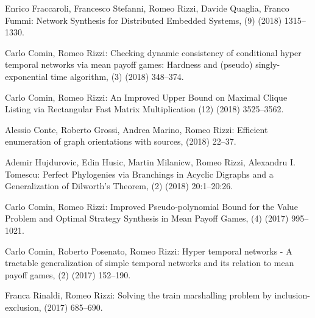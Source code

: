 \begin{etaremune}
  \vspace{-3.0mm}
  
  \item {\sc Enrico Fraccaroli, Francesco Stefanni, Romeo Rizzi, Davide Quaglia, Franco Fummi:}
   \newblock Network Synthesis for Distributed Embedded Systems,
   (9) (2018) 1315--1330.

  \item {\sc Carlo Comin, Romeo Rizzi:}
   \newblock Checking dynamic consistency of conditional hyper temporal networks via mean payoff games: Hardness and (pseudo) singly-exponential time algorithm,
   (3) (2018) 348--374.

  \item {\sc Carlo Comin, Romeo Rizzi:}
    \newblock An Improved Upper Bound on Maximal Clique Listing via Rectangular Fast Matrix Multiplication
    (12) (2018) 3525--3562.
   
  \item {\sc Alessio Conte, Roberto Grossi, Andrea Marino, Romeo Rizzi:}
   \newblock Efficient enumeration of graph orientations with sources,
    (2018) 22--37.

  \item {\sc Ademir Hujdurovic, Edin Husic, Martin Milanicw, Romeo Rizzi, Alexandru I. Tomescu:}
   \newblock Perfect Phylogenies via Branchings in Acyclic Digraphs and a Generalization of Dilworth's Theorem,
   (2) (2018) 20:1--20:26.

  \item {\sc Carlo Comin, Romeo Rizzi:}
   \newblock Improved Pseudo-polynomial Bound for the Value Problem and Optimal Strategy Synthesis in Mean Payoff Games,
   (4) (2017) 995--1021.

  \item {\sc Carlo Comin, Roberto Posenato, Romeo Rizzi:}
   \newblock Hyper temporal networks - A tractable generalization of simple temporal networks and its relation to mean payoff games,
   (2) (2017) 152--190.

  \item {\sc Franca Rinaldi, Romeo Rizzi:}
   \newblock Solving the train marshalling problem by inclusion-exclusion,
    (2017) 685--690.


\end{etaremune}
